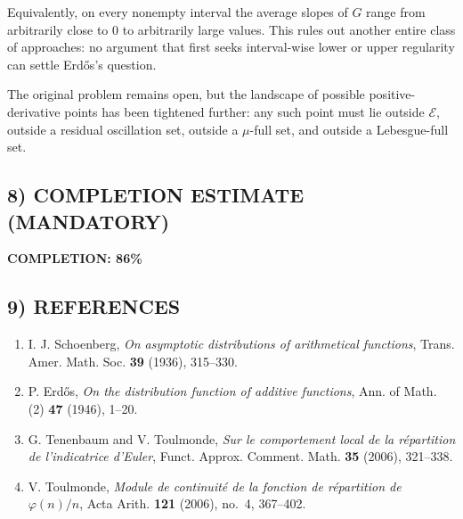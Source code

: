 Equivalently, on every nonempty interval the average slopes of $G$ range from arbitrarily close to $0$ to arbitrarily large values. This rules out another entire class of approaches: no argument that first seeks interval-wise lower or upper regularity can settle Erd\H{o}s's question.

The original problem remains open, but the landscape of possible positive-derivative points has been tightened further: any such point must lie outside $\mathcal E$, outside a residual oscillation set, outside a $\mu$-full set, and outside a Lebesgue-full set.

\subsection{8) COMPLETION ESTIMATE (MANDATORY)}

\textbf{COMPLETION: 86\%}

\subsection{9) REFERENCES}

\begin{enumerate}
\item I. J. Schoenberg, \emph{On asymptotic distributions of arithmetical functions}, Trans. Amer. Math. Soc. \textbf{39} (1936), 315--330.
\item P. Erd\H{o}s, \emph{On the distribution function of additive functions}, Ann. of Math. (2) \textbf{47} (1946), 1--20.
\item G. Tenenbaum and V. Toulmonde, \emph{Sur le comportement local de la r\'epartition de l'indicatrice d'Euler}, Funct. Approx. Comment. Math. \textbf{35} (2006), 321--338.
\item V. Toulmonde, \emph{Module de continuit\'e de la fonction de r\'epartition de $\varphi(n)/n$}, Acta Arith. \textbf{121} (2006), no.~4, 367--402.
\end{enumerate}
